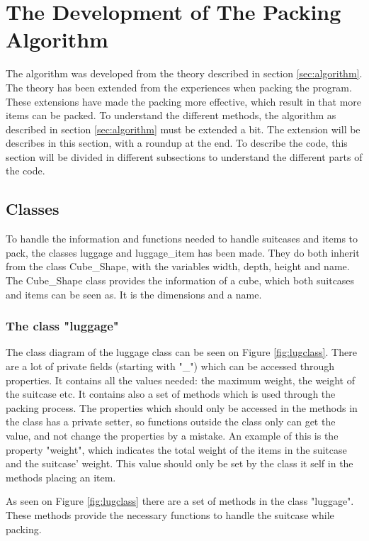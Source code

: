 \section{The Development of The Packing Algorithm}
\label{sec:devalgorithm}
The algorithm was developed from the theory described in section \ref{sec:algorithm}. The theory has been extended from the experiences when packing the program. These extensions have made the packing more effective, which result in that more items can be packed. 
To understand the different methods, the algorithm as described in section \ref{sec:algorithm} must be extended a bit. The extension will be describes in this section, with a roundup at the end. To describe the code, this section will be divided in different subsections to understand the different parts of the code.

\subsection{Classes}
To handle the information and functions needed to handle suitcases and items to pack, the classes luggage and luggage\_item has been made. They do both inherit from the class Cube\_Shape, with the variables width, depth, height and name. The Cube\_Shape class provides the information of a cube, which both suitcases and items can be seen as. It is the dimensions and a name. 
\subsubsection{The class "luggage"}
The class diagram of the luggage class can be seen on Figure \ref{fig:lugclass}. There are a lot of private fields (starting with "\_") which can be accessed through properties. It contains all the values needed: the maximum weight, the weight of the suitcase etc. It contains also a set of methods which is used through the packing process. The properties which should only be accessed in the methods in the class has a private setter, so functions outside the class only can get the value, and not change the properties by a mistake. An example of this is the property "weight", which indicates the total weight of the items in the suitcase and the suitcase' weight. This value should only be set by the class it self in the methods placing an item.


As seen on Figure \ref{fig:lugclass} there are a set of methods in the class "luggage". These methods provide the necessary functions to handle the suitcase while packing.

